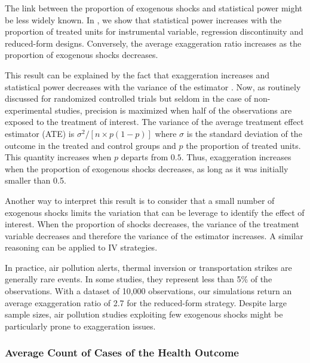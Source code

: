\documentclass[12pt]{article}
\begin{document}
            The link between the proportion of exogenous shocks and statistical power might be less widely known. In , we show that statistical power increases with the proportion of treated units for instrumental variable, regression discontinuity and reduced-form designs. Conversely, the average exaggeration ratio increases as the proportion of exogenous shocks decreases. 

            This result can be explained by the fact that exaggeration increases and statistical power decreases with the variance of the estimator \citep{zwet_significance_2021, lu_note_2019}. Now, as routinely discussed for randomized controlled trials but seldom in the case of non-experimental studies, precision is maximized when half of the observations are exposed to the treatment of interest. The variance of the average treatment effect estimator (ATE) is $\sigma^2/[n\times p(1 - p)]$ where $\sigma$ is the standard deviation of the outcome in the treated and control groups and $p$ the proportion of treated units. This quantity increases when $p$ departs from $0.5$. Thus, exaggeration increases when the proportion of exogenous shocks decreases, as long as it was initially smaller than 0.5.
            
            Another way to interpret this result is to consider that a small number of exogenous shocks limits the variation that can be leverage to identify the effect of interest. When the proportion of shocks decreases, the variance of the treatment variable decreases and therefore the variance of the estimator increases. A similar reasoning can be applied to IV strategies.

            \begin{sloppypar}
            In practice, air pollution alerts, thermal inversion or transportation strikes are generally rare events. In some studies, they represent less than 5\% of the observations. With a dataset of 10,000 observations, our simulations return an average exaggeration ratio of 2.7 for the reduced-form strategy. Despite large sample sizes, air pollution studies exploiting few exogenous shocks might be particularly prone to exaggeration issues.
            \end{sloppypar}
            
        \subsubsection*{Average Count of Cases of the Health Outcome}
    
\end{document}

